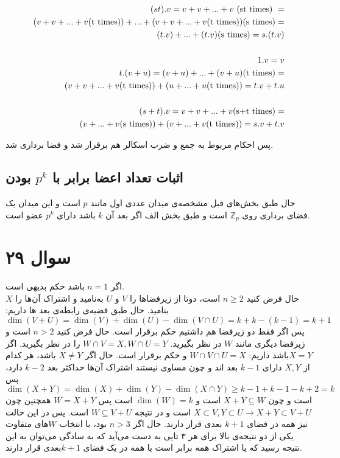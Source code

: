 \documentclass[12pt,a4paper]{article}
\begin{document}
\begin{latin}
\begin{align*}
(st).v = v+v+...+v \text{\space(st times)\space} =\\ (v+v+...+v \text{(t times)})+ ... + (v+v+...+v \text{(t times)}) \text{(s times)} = \\
(t.v) + ... + (t.v) \text{(s times)} = s.(t.v)
\\
\\
1.v = v
\\
t.(v+u) = (v+u)+...+(v+u) \text{(t times)} =\\ (v+v+...+v \text{(t times)}) + (u + ... + u \text{(t times)}) = t.v + t.u
\\
\\
(s+t).v = v+v+...+v \text{(s+t times)} = \\
(v+...+v \text{(s times)}) + (v+...+v \text{(t times)}) = s.v + t.v
\end{align*}
\end{latin}
پس احکام مربوط به جمع و ضرب اسکالر هم برقرار شد و فضا برداری شد.

\subsection{اثبات تعداد اعضا برابر با $p^k$ بودن}
حال طبق بخش‌های قبل مشخصه‌ی میدان عددی اول مانند $p$ است و این میدان یک فضای برداری روی 
$\mathbb{Z}_p$
است و طبق بخش الف اگر بعد آن $k$ باشد دارای $p^k$ عضو است.


\section{سوال ۲۹}
اگر $n=1$ باشد حکم بدیهی است.
\\
حال فرض کنید
$n \geq 2$
است، دوتا از زیرفضا‌ها را $V$ و $U$ به‌نامید و اشتراک آن‌ها را $X$ بنامید.
حال طبق قضیه‌ی رابطه‌ی بعد ها داریم:
$\dim(V+U) = \dim(V) + \dim(U) - \dim(V \cap U) = k + k - (k-1) = k+1$
پس اگر فقط دو زیرفضا هم داشتیم حکم برقرار است. حال فرض کنید $n>2$ است و زیرفضا دیگری مانند $W$ در نظر بگیرید.
$W \cap V = X, W \cap U = Y$
را در نظر بگیرید. اگر $X=Y$باشد داریم:
$W \cap V \cap U = X$
و حکم برقرار است. حال اگر 
$X \neq Y$
باشد، هر کدام از $X, Y$ دارای $k-1$ بعد اند و چون مساوی نیستند اشتراک آن‌ها حداکثر بعد
$k-2$
دارد، پس 
$\dim(X+Y) = \dim(X)+\dim(Y) - \dim(X\cap Y) \geq k-1 + k-1 - k + 2 = k$
است و چون 
$X+Y \subseteq W$ 
است و 
$\dim(W) = k$
است پس
$W = X+Y$
همچنین چون
$X \subset V, Y \subset U \rightarrow X+Y \subset V+U$
است و در نتیجه
$W \subseteq V+U$
است. پس در این حالت نیز همه در فضای $k+1$ بعدی قرار دارند. حال اگر $n>3$ بود، با انتخاب $W$های متفاوت یکی از دو نتیجه‌ی بالا برای هر ۳ تایی به دست می‌آید که به سادگی می‌توان به این نتیجه رسید که یا اشتراک همه برابر است یا همه در یک فضای $k+1$بعدی قرار دارند.
\end{document}
